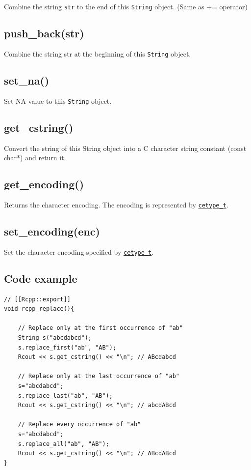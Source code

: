 \documentclass[]{book}
\theoremstyle{definition}
\theoremstyle{definition}
\theoremstyle{remark}
\begin{document}
Combine the string \texttt{str} to the end of this \texttt{String}
object. (Same as += operator)

\subsection{push\_back(str)}\label{push_backstr-1}

Combine the string str at the beginning of this \texttt{String} object.

\subsection{set\_na()}\label{set_na}

Set NA value to this \texttt{String} object.

\subsection{get\_cstring()}\label{get_cstring}

Convert the string of this String object into a C character string
constant (const char*) and return it.

\subsection{get\_encoding()}\label{get_encoding}

Returns the character encoding. The encoding is represented by
\href{https://github.com/wch/r-source/blob/bf0a0a9d12f2ce5d66673dc32cd253524f3270bf/src/include/Rinternals.h\#L928-L935}{\texttt{cetype\_t}}.

\subsection{set\_encoding(enc)}\label{set_encodingenc}

Set the character encoding specified by
\href{https://github.com/wch/r-source/blob/bf0a0a9d12f2ce5d66673dc32cd253524f3270bf/src/include/Rinternals.h\#L928-L935}{\texttt{cetype\_t}}.

\subsection{Code example}\label{code-example}

\begin{verbatim}
// [[Rcpp::export]]
void rcpp_replace(){

    // Replace only at the first occurrence of "ab"
    String s("abcdabcd");
    s.replace_first("ab", "AB");
    Rcout << s.get_cstring() << "\n"; // ABcdabcd

    // Replace only at the last occurrence of "ab"
    s="abcdabcd";
    s.replace_last("ab", "AB");
    Rcout << s.get_cstring() << "\n"; // abcdABcd

    // Replace every occurrence of "ab"
    s="abcdabcd";
    s.replace_all("ab", "AB");
    Rcout << s.get_cstring() << "\n"; // ABcdABcd
}
\end{verbatim}
\end{document}
